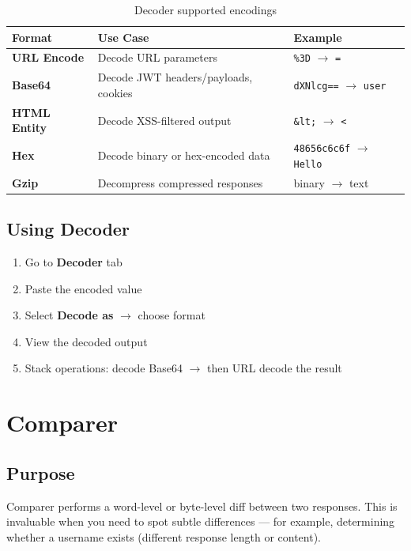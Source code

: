 \begin{table}[H]
\centering
\caption{Decoder supported encodings}
\begin{tabularx}{\textwidth}{>{\bfseries}lXl}
\toprule
Format & Use Case & Example \\
\midrule
URL Encode & Decode URL parameters & \texttt{\%3D} $\to$ \texttt{=} \\
Base64 & Decode JWT headers/payloads, cookies & \texttt{dXNlcg==} $\to$ \texttt{user} \\
HTML Entity & Decode XSS-filtered output & \texttt{\&lt;} $\to$ \texttt{<} \\
Hex & Decode binary or hex-encoded data & \texttt{48656c6c6f} $\to$ \texttt{Hello} \\
Gzip & Decompress compressed responses & binary $\to$ text \\
\bottomrule
\end{tabularx}
\end{table}

\subsection{Using Decoder}

\begin{enumerate}
  \item Go to \textbf{Decoder} tab
  \item Paste the encoded value
  \item Select \textbf{Decode as} $\to$ choose format
  \item View the decoded output
  \item Stack operations: decode Base64 $\to$ then URL decode the result
\end{enumerate}


\section{Comparer}
\label{sec:comparer}

\subsection{Purpose}

Comparer performs a word-level or byte-level diff between two responses. This is invaluable when you need to spot subtle differences — for example, determining whether a username exists (different response length or content).

